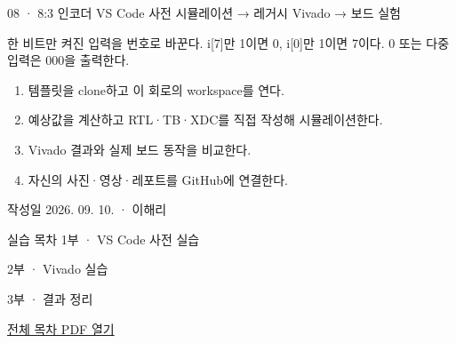 
\renewcommand{\labonehome}{\hyperlink{legacy-08-contents}{\contentsbutton}}
\renewcommand{\legacySource}[1]{}
\providecommand{\terminalbox}[1]{\par\vspace{0.15cm}{\setlength{\fboxsep}{7pt}\colorbox{black}{\parbox{\dimexpr\textwidth-14pt\relax}{\color{white}\ttfamily\fontsize{7}{9}\selectfont #1}}}\par\vspace{0.15cm}}

\begingroup
\renewcommand{\small}{\fontsize{9}{11}\selectfont}
\begin{frame}{08 · 8:3 인코더}\relax
\small
VS Code 사전 시뮬레이션 → 레거시 Vivado → 보드 실험\par\vspace{0.22cm}한 비트만 켜진 입력을 번호로 바꾼다. i[7]만 1이면 0, i[0]만 1이면 7이다. 0 또는 다중 입력은 000을 출력한다.\par\begin{enumerate}\setlength{\itemsep}{0.22cm}
\item 템플릿을 clone하고 이 회로의 workspace를 연다.
\item 예상값을 계산하고 RTL·TB·XDC를 직접 작성해 시뮬레이션한다.
\item Vivado 결과와 실제 보드 동작을 비교한다.
\item 자신의 사진·영상·레포트를 GitHub에 연결한다.
\end{enumerate}
작성일 2026. 09. 10. · 이해리\par
\end{frame}

\begin{frame}[label=legacy-08-contents]{실습 목차}\relax
\small
1부 · VS Code 사전 실습\par{}\par\vspace{0.2cm}
\par\vspace{0.4cm}
2부 · Vivado 실습\par{}\par\vspace{0.4cm}
3부 · 결과 정리\par{}\par\vspace{0.35cm}
\href{04.LAB1_00_CONTENTS.pdf}{전체 목차 PDF 열기}
\end{frame}

